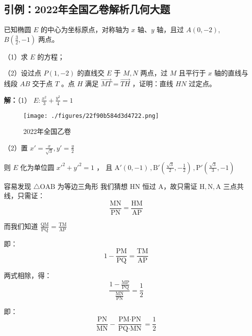\begin{issues}
\end{issues}

\subsection{引例：2022年全国乙卷解析几何大题}

已知椭圆 $\displaystyle{E}$ 的中心为坐标原点，对称轴为 $\displaystyle{x}$ 轴、$\displaystyle{y}$ 轴，且过 $\displaystyle{A(0,-2)}$,$\displaystyle{B\left(\frac{3}{2},-1\right)}$ 两点。

（1）求 $\displaystyle{E}$ 的方程；

（2）设过点 $\displaystyle{P(1,-2)}$ 的直线交 $\displaystyle{E}$ 于 $\displaystyle{M,N}$ 两点，过 $\displaystyle{M}$ 且平行于 $\displaystyle{x}$ 轴的直线与线段 $\displaystyle{AB}$ 交于点 $\displaystyle{T}$ 。点 $\displaystyle{H}$ 满足 $\displaystyle{\overrightarrow{MT}=\overrightarrow{TH}}$ ，证明：直线 $\displaystyle{HN}$ 过定点。

\textbf{解：}（1） $\displaystyle{E:\frac{x^2}{3}+\frac{y^2}{4}=1}$
\begin{figure}[ht]
\centering
\texttt{[image: ./figures/22f90b584d3d4722.png]}
\caption{2022年全国乙卷} \label{fig_affine_13}
\end{figure}
（2）置 $\displaystyle{x'=\frac{x}{\sqrt{3}},y'=\frac{y}{2}}$

则 $\displaystyle{E}$ 化为单位圆 $\displaystyle{x'^2+y'^2=1}$ ， 且 $\displaystyle{\text{A}'(0,-1)\,,\text{B}'\left(\frac{\sqrt{3}}{2},-\frac{1}{2}\right)\,,\text{P}'\left(\frac{\sqrt{3}}{3},-1\right)}$

容易发现 $\displaystyle{\triangle \text{OAB}}$ 为等边三角形
我们猜想 $\displaystyle{\text{HN}}$ 恒过 $\displaystyle{\text{A}}$，故只需证 $\displaystyle{\text{H},\text{N},\text{A}}$ 三点共线，只需证：
$$\frac{\text{MN}}{\text{PN}}=\frac{\text{HM}}{\text{AP}}$$

而我们知道 $\displaystyle{\frac{\text{QM}}{\text{PQ}}=\frac{\text{TM}}{\text{AP}}}$ 

即：
$$1-\frac{\text{PM}}{\text{PQ}}=\frac{\text{TM}}{\text{AP}}$$

两式相除，得：
$$\frac{1-\frac{\text{MP}}{\text{PQ}}}{\frac{\text{MN}}{\text{PN}}}=\frac{1}{2}$$

即：
$$\frac{\text{PN}}{\text{MN}}-\frac{\text{PM}\cdot\text{PN}}{\text{PQ}\cdot\text{MN}}=\frac{1}{2}$$

